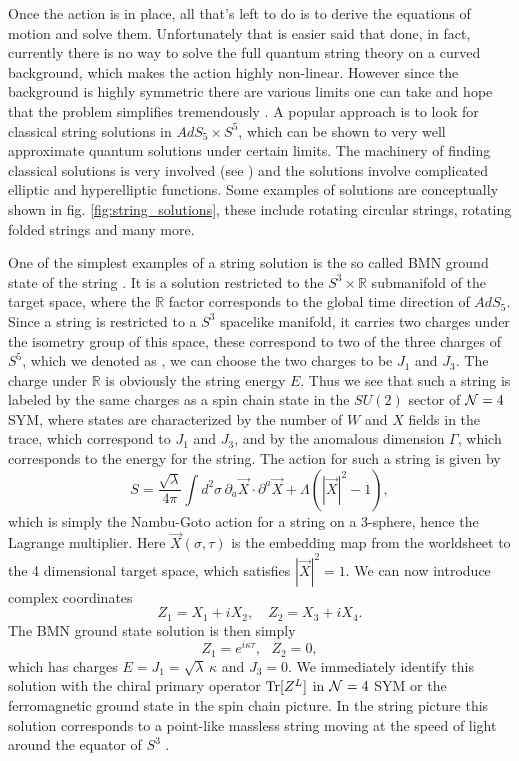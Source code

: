 Once the action is in place, all that's left to do is to derive the equations of motion and solve them. Unfortunately that is easier said that done, in fact, currently there is no way to solve the full quantum string theory on a curved background, which makes the action highly non-linear. However since the background is highly symmetric there are various limits one can take and hope that the problem simplifies tremendously \cite{algebraic_curve}. A popular approach is to look for classical string solutions in $AdS_5 \times S^5$, which can be shown to very well approximate quantum solutions under certain limits. The machinery of finding classical solutions is very involved (see \cite{tseytlin_classical}) and the solutions involve complicated elliptic and hyperelliptic functions. Some examples of solutions are conceptually shown in fig. \ref{fig:string_solutions}, these include rotating circular strings, rotating folded strings and many more. 

One of the simplest examples of a string solution is the so called BMN ground state of the string \cite{dorey}. It is a solution restricted to the $S^3 \times \mathbb{R}$ submanifold of the target space, where the $\mathbb{R}$ factor corresponds to the global time direction of $AdS_5$. Since a string is restricted to a $S^3$ spacelike manifold, it carries two charges under the isometry group of this space, these correspond to two of the three charges of $S^5$, which we denoted as \text{[$J_1$, $J_2$, $J_3$]}, we can choose the two charges to be $J_1$ and $J_3$. The charge under $\mathbb{R}$ is obviously the string energy $E$. Thus we see that such a string is labeled by the same charges as a spin chain state in the $SU(2)$ sector of $\mathcal{N}=4$ SYM, where states are characterized by the number of $W$ and $X$ fields in the trace, which correspond to $J_1$ and $J_3$, and by the anomalous dimension $\Gamma$, which corresponds to the energy for the string. The action for such a string is given by
\begin{equation}
	S = \frac{\sqrt{\lambda}}{4 \pi} \int d^2 \sigma \, \partial_a \vec{X} \cdot \partial^a \vec{X} + \Lambda\left(  |\vec{X}|^2 - 1 \right),
\end{equation}
which is simply the Nambu-Goto action for a string on a 3-sphere, hence the Lagrange multiplier. Here $\vec{X}(\sigma, \tau)$ is the embedding map from the worldsheet to the 4 dimensional target space, which satisfies $|\vec{X}|^2 = 1$. We can now introduce complex coordinates
\begin{equation}
Z_1 = X_1 + iX_2, \,\,\,\,\,\, Z_2 = X_3 + iX_4.
\end{equation}
The BMN ground state solution is then simply
\begin{equation}
	Z_1 = e^{i \kappa \tau}, \,\,\,\, Z_2 = 0,
\end{equation}
which has charges $E = J_1 = \sqrt{\lambda} \, \kappa$ and $J_3 = 0$. We immediately identify this solution with the chiral primary operator $\mathrm{Tr} [Z^L]$ in $\mathcal{N}=4$ SYM or the ferromagnetic ground state in the spin chain picture. In the string picture this solution corresponds to a point-like massless string moving at the speed of light around the equator of $S^3$ \cite{dorey}. 

